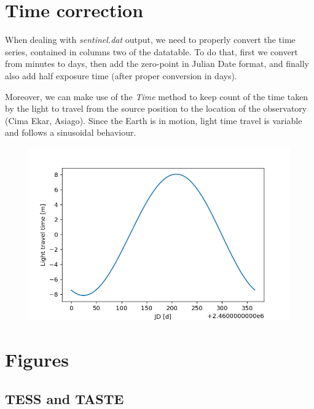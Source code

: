 \documentclass[a4paper,11pt,twocolumn]{article}
\begin{document}
\section{Time correction}
\label{sect:app_B}

When dealing with \textit{sentinel.dat} output, we need to properly convert the 
time series, contained in columns two of the datatable. To do that, first we
convert from minutes to days, then add the zero-point in Julian Date format, and 
finally also add half exposure time (after proper conversion in days).

Moreover, we can make use of the \textit{Time} method to keep count of the time 
taken by the light to travel from the source position to the location of the 
observatory (Cima Ekar, Asiago). Since the Earth is in motion, light time 
travel is variable and follows a sinusoidal behaviour.
\begin{figure}[H]
    \centering  
    \includegraphics[scale=0.4, angle=0]{../pictures/time_corr.png}
\end{figure}


\section{Figures}




\subsection{TESS and TASTE}
\label{sect:app_C_TT}
\end{document}
